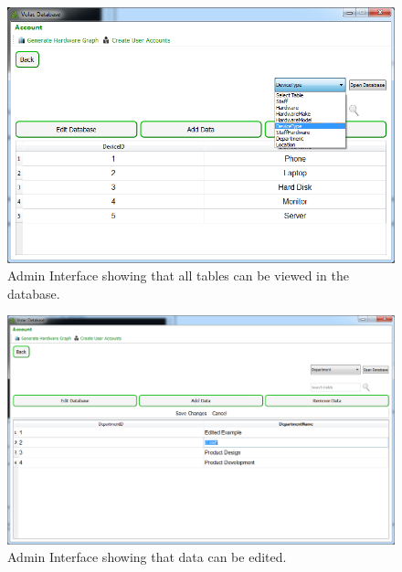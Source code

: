 \begin{figure}[H]
    \includegraphics[width=\textwidth]{./Evaluation/Images/admin1.png}
    \caption{Admin Interface showing that all tables can be viewed in the database.} 
\end{figure}

\begin{figure}[H]
    \includegraphics[width=\textwidth]{./Evaluation/Images/admin2.png}
    \caption{Admin Interface showing that data can be edited.} 
\end{figure}


